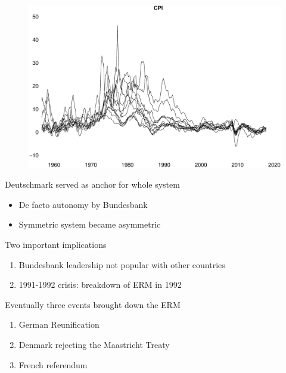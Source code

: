 \documentclass{beamer}
\begin{document}
\begin{frame}
  \begin{figure}
    \includegraphics[scale=.29]{cpi.eps}
  \end{figure}
\end{frame}

\begin{frame}
  Deutschmark served as anchor for whole system
  \begin{itemize}
    \item De facto autonomy by Bundesbank
    \item Symmetric system became asymmetric
  \end{itemize}
  \medskip
  Two important implications 
\begin{enumerate}
  \item Bundesbank leadership not popular with other countries
  \item 1991-1992 crisis: breakdown of ERM in 1992
\end{enumerate}
\end{frame}


\begin{frame}
  Eventually three events brought down the ERM
\begin{enumerate}
  \item German Reunification
  \item Denmark rejecting the Maastricht Treaty
  \item French referendum
\end{enumerate}
\end{frame}
\end{document}
